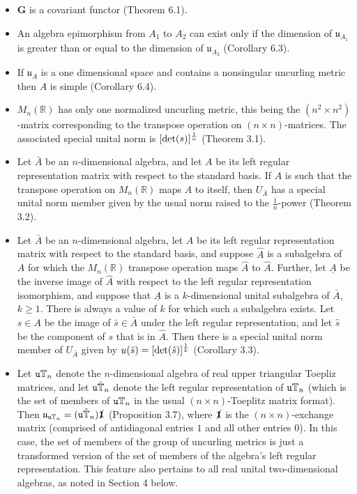 \documentclass{amsart}
\numberwithin{equation}{section}
\theoremstyle{definition}
\numberwithin{theorem}{section}
\begin{document}
\begin{itemize} 
\item $\mathbf{G}$ is a covariant functor (Theorem 6.1).
\item An algebra epimorphism from $A_1$ to $A_2$ can exist only if the dimension of $\mathfrak{u}_{A_1}$ is greater than or equal to the dimension of $\mathfrak{u}_{A_2}$ (Corollary 6.3). 
\item If $\mathfrak{u}_A$ is a one dimensional space and contains a nonsingular uncurling metric then $A$ is simple (Corollary 6.4).
\item  $ M_n(\mathbb{R})$ has only one normalized uncurling metric, this being the $(n^2\times n^2)$-matrix corresponding to the  transpose operation on $(n\times n)$-matrices. The associated special unital norm is $[{\rm det}(s)]^{\frac{1}{n}}$ (Theorem 3.1). 
\item Let $\bar{A}$ be an $n$-dimensional algebra, and let $A$ be its left regular representation matrix with respect to the standard basis.  If $A$ is such that the transpose operation on $ M_n(\mathbb{R})$ maps $A$ to itself, then $ U_{\bar{A}}$ has a special unital norm member given by the usual norm raised to the $\frac{1}{n}$-power (Theorem 3.2).
\item Let $\bar{A}$ be an $n$-dimensional algebra, let $A$ be its left regular representation matrix with respect to the standard basis, and suppose $\hat{A}$ is a subalgebra of $A$ for which the $ M_n(\mathbb{R})$ transpose operation maps $\hat{A}$ to $\hat{A}$.  Further, let $\underline{A}$ be the inverse image of $\hat{A}$ with respect to the left regular representation isomorphism, and suppose that $\underline{A}$ is a $k$-dimensional unital subalgebra of $\bar{A}$, $k\ge 1$.  There is always a value of $k$ for which such a subalgebra exists.  Let $s\in A$ be the image of $\bar{s}\in \bar{A}$ under the left regular representation, and let $\hat{s}$ be the component of $s$ that is in $\hat{A}$.  Then there is a special unital norm member of $ U_{\bar{A}}$ given by $ u(\bar{s}) = [\text{\rm det}(\hat{s})]^{\frac{1}{k}}$ (Corollary 3.3).
\item Let ${\tt u}\mathbb{T}_n$ denote the $n$-dimensional algebra of real upper triangular Toepliz matrices, and let ${\tt u}\hat{\mathbb{T}}_n$  denote the left regular representation of ${\tt u}\mathbb{T}_n$ (which is the set of members of ${\tt u}\mathbb{T}_n$ in the usual $(n\times n)$-Toeplitz matrix format).  Then $\mathfrak{u}_{{\tt u}\mathbb{T}_n} = ({\tt u}\hat{\mathbb{T}}_n)\slashed{\mathbf{1}}$ (Proposition 3.7), where $\slashed{\mathbf{1}}$ is the $(n\times n)$-exchange matrix (comprised of antidiagonal entries $1$ and all other entries $0$).  In this case, the set of members of the group of uncurling metrics is just a transformed version of the set of members of the algebra's left regular representation.  This feature also pertains to all real unital two-dimensional algebras, as noted in Section 4 below.

\end{itemize}
\end{document}
